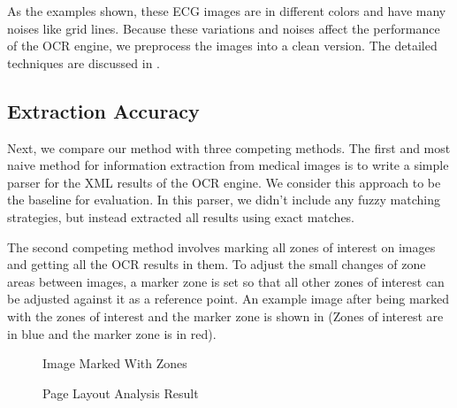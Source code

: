 As the examples shown, these ECG images are in different colors 
and have many noises like grid lines. 
Because these variations and noises affect the performance of the OCR engine, 
we preprocess the images into a clean version. 
The detailed techniques are discussed in . 


\subsection{Extraction Accuracy}
Next, we compare our method with three competing methods.
The first and most naive method for information extraction from medical images 
is to write a simple parser for the XML results of the OCR engine. 
We consider this approach to be the baseline for 
evaluation. In this parser, we didn't include any fuzzy matching 
strategies, but instead extracted all results using exact matches. 

The second competing method involves marking all zones of interest 
on images and getting all the OCR results in them. 
To adjust the small changes of 
zone areas between images, a marker zone is set so that 
all other zones of interest can be adjusted against it as
a reference point. 
An example image after being marked with the zones of interest 
and the marker zone is shown in  (Zones of interest 
are in blue and the marker zone is in red).

\begin{figure}[th]
\begin{minipage}{0.5\columnwidth}
\centering
{}
\caption{Image Marked With Zones}
\label{fig:zOCR}
\end{minipage}
\begin{minipage}{0.5\columnwidth}
\centering
{}
\caption{Page Layout Analysis Result}
\label{fig:pl}
\end{minipage}
\end{figure}

